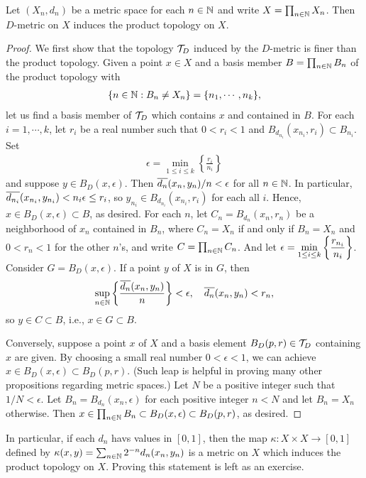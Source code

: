 \begin{thm}
    Let $(X_n, d_n)$ be a metric space for each $n\in{\mathbb{N}}$ and write $X=\prod_{n\in{\mathbb{N}}} X_n$.
    Then $D$-metric on $X$ induces the product topology on $X$.
\end{thm}
\begin{proof}
    We first show that the topology ${\mathcal{T}}_D$ induced by the $D$-metric is finer than the product topology.
    Given a point $x\in X$ and a basis member $B=\prod_{n\in{\mathbb{N}}}B_n$ of the product topology with
    \begin{align*}
        \displaystyle{\{n\in{\mathbb{N}}:B_n\neq X_n\}=\{n_1, \cdots, n_k\}},
    \end{align*}
    let us find a basis member of ${\mathcal{T}}_D$ which contains $x$ and contained in $B$.
    For each $i=1, \cdots, k$, let $r_i$ be a real number such that $0<r_i<1$ and $B_{d_{n_i}}(x_{n_i}, r_i)\subset B_{n_i}$.
    Set
    \begin{align*}
        \epsilon=\min_{1\leq i\leq k}\left\{\frac{r_i}{n_i}\right\}
    \end{align*}
    and suppose $y\in B_D(x, \epsilon)$.
    Then $\overline{d_n}(x_n, y_n)/n<\epsilon$ for all $n\in{\mathbb{N}}$.
    In particular, $\overline{d_{n_i}}(x_{n_i}, y_{n_i})<n_i\epsilon\leq r_i$, so $y_{n_i}\in B_{d_{n_i}}(x_{n_i}, r_i)$ for each all $i$.
    Hence, $x\in B_D(x, \epsilon)\subset B$, as desired.
    \ifinclude\else
    For each $n$, let $C_n=B_{d_n}(x_n, r_n)$ be a neighborhood of $x_n$ contained in $B_n$, where $C_n=X_n$ if and only if $B_n=X_n$ and $0<r_n<1$ for the other $n$'s, and write $C=\prod_{n\in{\mathbb{N}}}C_n$.
    And let $\displaystyle{\epsilon=\min_{1\leq i\leq k}\left\{\frac{r_{n_i}}{n_i}\right\}}$.
    Consider $G=B_D(x, \epsilon)$.
    If a point $y$ of $X$ is in $G$, then
    \begin{align*}
        \sup_{n\in{\mathbb{N}}}\left\{\frac{\overline{d_n}(x_n, y_n)}{n}\right\} < \epsilon,\quad\overline{d_n}(x_n, y_n) < r_n,
    \end{align*}
    so $y\in C\subset B$, i.e., $x\in G\subset B$.
    \fi
    
    Conversely, suppose a point $x$ of $X$ and a basis element $B_D(p, r)\in {\mathcal{T}}_D$ containing $x$ are given.
    By choosing a small real number $0<\epsilon<1$, we can achieve $x\in B_D(x, \epsilon)\subset B_D(p, r)$.
    \color{teal}(Such leap is helpful in proving many other propositions regarding metric spaces.) \color{black}
    Let $N$ be a positive integer such that $1/N < \epsilon$.
    Let $B_n=B_{d_n}(x_n, \epsilon)$ for each positive integer $n<N$ and let $B_n=X_n$ otherwise.
    Then $x\in\prod_{n\in{\mathbb{N}}}B_n\subset B_D(x, \epsilon)\subset B_D(p, r)$, as desired.
\end{proof}
\begin{rmk}
    In particular, if each $d_n$ havs values in $[0, 1]$, then the map $\kappa: X\times X \rightarrow [0, 1]$ defined by $\kappa(x, y)=\sum_{n\in{\mathbb{N}}} 2^{-n} d_n(x_n, y_n)$ is a metric on $X$ which induces the product topology on $X$.
    \color{brown}Proving this statement is left as an exercise. \color{black}
\end{rmk}

